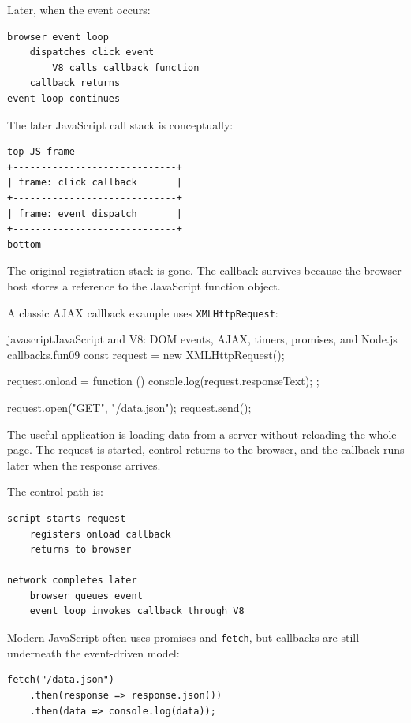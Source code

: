 Later, when the event occurs:

\begin{verbatim}
browser event loop
    dispatches click event
        V8 calls callback function
    callback returns
event loop continues
\end{verbatim}

The later JavaScript call stack is conceptually:

\begin{verbatim}
top JS frame
+-----------------------------+
| frame: click callback       |
+-----------------------------+
| frame: event dispatch       |
+-----------------------------+
bottom
\end{verbatim}

The original registration stack is gone. The callback survives because the browser host stores a reference to the JavaScript function object.

A classic AJAX callback example uses \texttt{XMLHttpRequest}:

\begin{codebox}[]{javascript}{JavaScript and V8: DOM events, AJAX, timers, promises, and Node.js callbacks.}{fun09}
const request = new XMLHttpRequest();

request.onload = function () {
    console.log(request.responseText);
};

request.open("GET", "/data.json");
request.send();
\end{codebox}


The useful application is loading data from a server without reloading the whole page. The request is started, control returns to the browser, and the callback runs later when the response arrives.

The control path is:

\begin{verbatim}
script starts request
    registers onload callback
    returns to browser

network completes later
    browser queues event
    event loop invokes callback through V8
\end{verbatim}

Modern JavaScript often uses promises and \texttt{fetch}, but callbacks are still underneath the event-driven model:

\begin{verbatim}
fetch("/data.json")
    .then(response => response.json())
    .then(data => console.log(data));
\end{verbatim}

